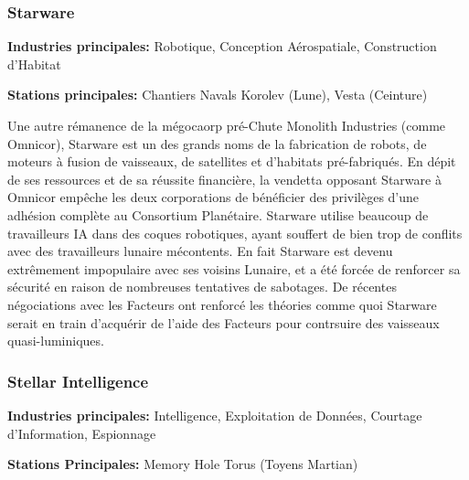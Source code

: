                            \subsubsection{Starware} \label{sec:starware} 

                           \textbf{Industries principales:} Robotique, Conception Aérospatiale, Construction d'Habitat 

                           \textbf{Stations principales:} Chantiers Navals Korolev (Lune), Vesta (Ceinture) 

                           Une autre rémanence de la mégocaorp pré-Chute Monolith Industries (comme Omnicor), Starware est un des grands noms de la fabrication de robots, de moteurs à fusion de vaisseaux, de satellites et d'habitats pré-fabriqués. En dépit de ses ressources et de sa réussite financière, la vendetta opposant Starware à Omnicor empêche les deux corporations de bénéficier des privilèges d'une adhésion complète au Consortium Planétaire. Starware utilise beaucoup de travailleurs IA dans des coques robotiques, ayant souffert de bien trop de conflits avec des travailleurs lunaire mécontents. En fait Starware est devenu extrêmement impopulaire avec ses voisins Lunaire, et a été forcée de renforcer sa sécurité en raison de nombreuses tentatives de sabotages. De récentes négociations avec les Facteurs ont renforcé les théories comme quoi Starware serait en train d'acquérir de l'aide des Facteurs pour contrsuire des vaisseaux quasi-luminiques. 

                           \subsubsection{Stellar Intelligence} \label{sec:stellar-intelligence} 

                           \textbf{Industries principales:} Intelligence, Exploitation de Données, Courtage d'Information, Espionnage 

                           \textbf{Stations Principales:} Memory Hole Torus (Toyens Martian) 

